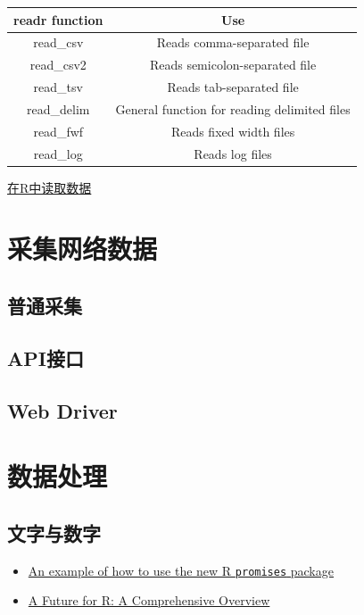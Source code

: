 \documentclass[]{book}
\providecommand{\tightlist}{%
  \setlength{\itemsep}{0pt}\setlength{\parskip}{0pt}}
\begin{document}
\begin{longtable}[]{@{}cc@{}}
\toprule
readr function & Use\tabularnewline
\midrule
\endhead
read\_csv & Reads comma-separated file\tabularnewline
read\_csv2 & Reads semicolon-separated file\tabularnewline
read\_tsv & Reads tab-separated file\tabularnewline
read\_delim & General function for reading delimited
files\tabularnewline
read\_fwf & Reads fixed width files\tabularnewline
read\_log & Reads log files\tabularnewline
\bottomrule
\end{longtable}

\href{https://jeevanyue.github.io/post/2018-01-08-read_data_in_r/}{在R中读取数据}

\section{采集网络数据}

\subsection{普通采集}

\subsection{API接口}\label{api}

\subsection{Web Driver}\label{web-driver}

\section{数据处理}

\subsection{文字与数字}

\begin{itemize}
\tightlist
\item
  \href{https://appsilon.com/an-example-of-how-to-use-the-new-r-promises-package/}{An
  example of how to use the new R \texttt{promises} package}
\item
  \href{https://cran.r-project.org/web/packages/future/vignettes/future-1-overview.html}{A
  Future for R: A Comprehensive Overview}
\end{itemize}
\end{document}
